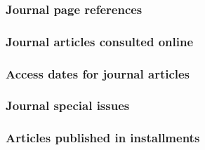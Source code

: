 \documentclass[11pt,letterpaper,oneside]{article}
\begin{document}
\setcounter{subsubsection}{173}
\subsubsection{Journal page references}

\begin{citebib}
\item \cite{gold2015}
\item \cite[2--3]{paudyal2015}
\end{citebib}

\subsubsection{Journal articles consulted online}

\begin{citebib}
\item \cite[268]{whitney1929}
\item \cite[260--61]{schoenfield2016}
\end{citebib}

\subsubsection{Access dates for journal articles}

\begin{citebib}
\item \cite[81]{narr2015}
\item \cite[88--89]{narr2015}
\end{citebib}

\setcounter{subsubsection}{177}
\subsubsection{Journal special issues}

\begin{citebib}
\item \cite{tezuka2013}
\end{citebib}

\setcounter{subsubsection}{179}
\subsubsection{Articles published in installments}
\end{document}
